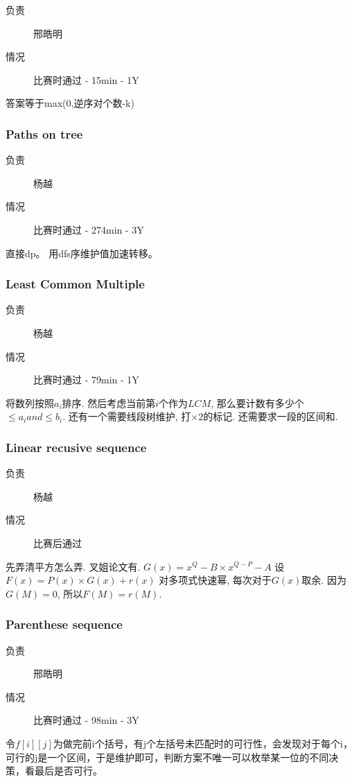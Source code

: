 \documentclass[a4paper, 11pt, nofonts, nocap, fancyhdr]{ctexart}
\newcommand{\problem}[1]{\subsubsection{#1}}
\begin{document}
\begin{description}
\item[负责] 邢皓明
\item[情况] 比赛时通过 - 15min - 1Y
	
\end{description}

答案等于max(0,逆序对个数-k)

\problem{Paths on tree}

\begin{description}
\item[负责] 杨越
\item[情况] 比赛时通过 - 274min - 3Y
	
\end{description}

直接dp。 用dfs序维护值加速转移。

\problem{Least Common Multiple}
	

\begin{description}
\item[负责] 杨越
\item[情况] 比赛时通过 - 79min - 1Y
\end{description}

将数列按照$a_i$排序. 然后考虑当前第$i$个作为$LCM$, 那么要计数有多少个 $\leq a_i and \leq  b_i$. 还有一个需要线段树维护, 打$\times 2$的标记. 还需要求一段的区间和.

\problem{Linear recusive sequence}

\begin{description}
\item[负责] 杨越
\item[情况] 比赛后通过
\end{description}

先弄清平方怎么弄. 叉姐论文有.
$G(x) = x^Q - B\times x^{Q-P} - A$
设$F(x) = P(x)\times G(x) + r(x)$
对多项式快速幂, 每次对于$G(x)$取余. 因为$G(M) = 0$, 所以$F(M) = r(M)$.

\problem{Parenthese sequence}

\begin{description}
\item[负责] 邢皓明
\item[情况] 比赛时通过 - 98min - 3Y
	
\end{description}

令$f[i][j]$为做完前i个括号，有j个左括号未匹配时的可行性，会发现对于每个i，可行的j是一个区间，于是维护即可，判断方案不唯一可以枚举某一位的不同决策，看最后是否可行。
\end{document}

